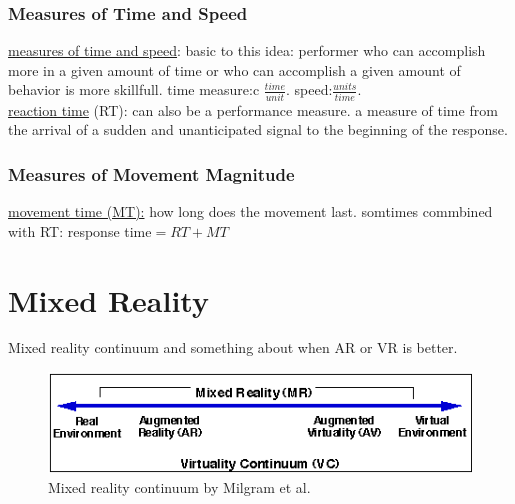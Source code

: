 \subsubsection{Measures of Time and Speed}
\underline{measures of time and speed}: basic to this idea: performer who can accomplish more in a given amount of time or who can accomplish a given amount of behavior is  more skillfull. time measure:c $\frac{time}{unit}$. speed:$\frac{units}{time}$.\\

\underline{reaction time} (RT): can also be a performance measure. a measure of time from the arrival of a sudden and unanticipated signal to the beginning of the response. 
\subsubsection{Measures of Movement Magnitude}
\underline{movement time (MT):} how long does the movement last. somtimes commbined with RT: response time$=RT+MT$

\section{Mixed Reality}
Mixed reality continuum \cite{Milgram1994} and something about when AR or VR is better. \todo \markAsevenMR

\begin{figure}
	\centering
	\includegraphics[width=1.0\textwidth]{img/milgram_continuum.png}
	\caption{Mixed reality continuum by Milgram et al. \cite{Milgram1994}}
	\label{fig:ego-exo-cont}
\end{figure}

